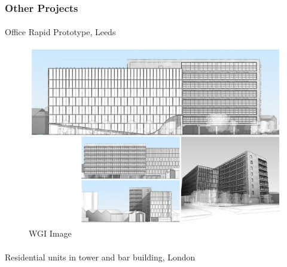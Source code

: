 \documentclass[
]{article}
\makeatletter
\let\oldparagraph\paragraph
\renewcommand{\paragraph}{
    \@ifstar
      \xxxParagraphStar
      \xxxParagraphNoStar
  }
\newcommand{\xxxParagraphStar}[1]{\oldparagraph*{#1}\mbox{}}
\newcommand{\xxxParagraphNoStar}[1]{\oldparagraph{#1}\mbox{}}
\makeatother
\begin{document}
\subsubsection{Other Projects}\label{other-projects}

\paragraph{Office Rapid Prototype,
Leeds}\label{office-rapid-prototype-leeds}

\begin{figure}[H]

{\centering \includegraphics{assets/WGI/WGI-2.png}

}

\caption{WGI Image}

\end{figure}%

\paragraph{Residential units in tower and bar building,
London}\label{residential-units-in-tower-and-bar-building-london}
\end{document}
